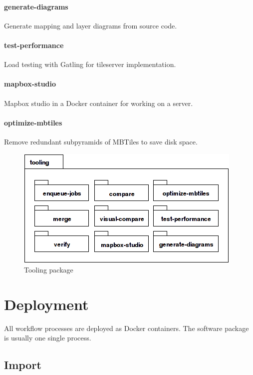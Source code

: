 \paragraph{generate-diagrams}
Generate mapping and layer diagrams from source code.

\paragraph{test-performance}
Load testing with Gatling for tileserver implementation.

\paragraph{mapbox-studio}
Mapbox studio in a Docker container for working on a server.

\paragraph{optimize-mbtiles}
Remove redundant subpyramids of MBTiles to save disk space.

\begin{figure}[h]
  \includegraphics[scale=0.6]{images/tooling_package_diagram.png}
  \caption{Tooling package}
\end{figure}

\newpage
\section{Deployment}\label{deployment}

All workflow processes are deployed as Docker containers. The software package
is usually one single process.

\subsection{Import}

